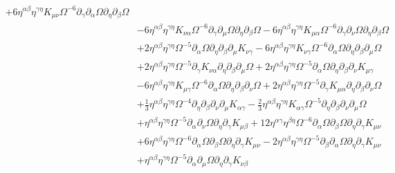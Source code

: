 \documentclass[10pt,letterpaper]{article}
\begin{document}
\begin{align}
 + 6 \eta^{\alpha \beta} \eta^{\gamma \eta} K_{\mu \nu} \Omega^{-6} \partial_{\gamma}\partial_{\alpha}\Omega \partial_{\eta}\partial_{\beta}\Omega\nonumber\\
& - 6 \eta^{\alpha \beta} \eta^{\gamma \eta} K_{\nu \alpha} \Omega^{-6} \partial_{\gamma}\partial_{\mu}\Omega \partial_{\eta}\partial_{\beta}\Omega
 - 6 \eta^{\alpha \beta} \eta^{\gamma \eta} K_{\mu \alpha} \Omega^{-6} \partial_{\gamma}\partial_{\nu}\Omega \partial_{\eta}\partial_{\beta}\Omega\nonumber\\
& + 2 \eta^{\alpha \beta} \eta^{\gamma \eta} \Omega^{-5} \partial_{\alpha}\Omega \partial_{\eta}\partial_{\beta}\partial_{\mu}K_{\nu \gamma}
 - 6 \eta^{\alpha \beta} \eta^{\gamma \eta} K_{\nu \gamma} \Omega^{-6} \partial_{\alpha}\Omega \partial_{\eta}\partial_{\beta}\partial_{\mu}\Omega\nonumber\\
& + 2 \eta^{\alpha \beta} \eta^{\gamma \eta} \Omega^{-5} \partial_{\gamma}K_{\nu \alpha} \partial_{\eta}\partial_{\beta}\partial_{\mu}\Omega
 + 2 \eta^{\alpha \beta} \eta^{\gamma \eta} \Omega^{-5} \partial_{\alpha}\Omega \partial_{\eta}\partial_{\beta}\partial_{\nu}K_{\mu \gamma}\nonumber\\
& - 6 \eta^{\alpha \beta} \eta^{\gamma \eta} K_{\mu \gamma} \Omega^{-6} \partial_{\alpha}\Omega \partial_{\eta}\partial_{\beta}\partial_{\nu}\Omega
 + 2 \eta^{\alpha \beta} \eta^{\gamma \eta} \Omega^{-5} \partial_{\gamma}K_{\mu \alpha} \partial_{\eta}\partial_{\beta}\partial_{\nu}\Omega\nonumber\\
& + \tfrac{1}{3} \eta^{\alpha \beta} \eta^{\gamma \eta} \Omega^{-4} \partial_{\eta}\partial_{\beta}\partial_{\nu}\partial_{\mu}K_{\alpha \gamma}
 -  \tfrac{2}{3} \eta^{\alpha \beta} \eta^{\gamma \eta} K_{\alpha \gamma} \Omega^{-5} \partial_{\eta}\partial_{\beta}\partial_{\nu}\partial_{\mu}\Omega\nonumber\\
& + \eta^{\alpha \beta} \eta^{\gamma \eta} \Omega^{-5} \partial_{\alpha}\partial_{\nu}\Omega \partial_{\eta}\partial_{\gamma}K_{\mu \beta}
 + 12 \eta^{\alpha \gamma} \eta^{\beta \eta} \Omega^{-6} \partial_{\alpha}\Omega \partial_{\beta}\Omega \partial_{\eta}\partial_{\gamma}K_{\mu \nu}\nonumber\\
& + 6 \eta^{\alpha \beta} \eta^{\gamma \eta} \Omega^{-6} \partial_{\alpha}\Omega \partial_{\beta}\Omega \partial_{\eta}\partial_{\gamma}K_{\mu \nu}
 - 2 \eta^{\alpha \beta} \eta^{\gamma \eta} \Omega^{-5} \partial_{\beta}\partial_{\alpha}\Omega \partial_{\eta}\partial_{\gamma}K_{\mu \nu}\nonumber\\
& + \eta^{\alpha \beta} \eta^{\gamma \eta} \Omega^{-5} \partial_{\alpha}\partial_{\mu}\Omega \partial_{\eta}\partial_{\gamma}K_{\nu \beta}

\end{align}
\end{document}
